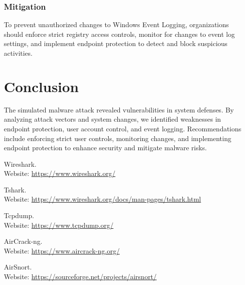 \documentclass[11pt]{article}
\begin{document}
\subsubsection{Mitigation}
To prevent unauthorized changes to Windows Event Logging, organizations should enforce strict registry access controls, monitor for changes to event log settings, and implement endpoint protection to detect and block suspicious activities.
\section{Conclusion}
The simulated malware attack revealed vulnerabilities in system defenses. By analyzing attack vectors and system changes, we identified weaknesses in endpoint protection, user account control, and event logging. Recommendations include enforcing strict user controls, monitoring changes, and implementing endpoint protection to enhance security and mitigate malware risks.

\clearpage
\begin{thebibliography}{99}
	Wireshark. \\
	Website: \url{https://www.wireshark.org/}

	Tshark. \\
	Website: \url{https://www.wireshark.org/docs/man-pages/tshark.html}

	Tcpdump. \\
	Website: \url{https://www.tcpdump.org/}

	AirCrack-ng. \\
	Website: \url{https://www.aircrack-ng.org/}

	AirSnort. \\
	Website: \url{https://sourceforge.net/projects/airsnort/}
\end{thebibliography}
\end{document}
